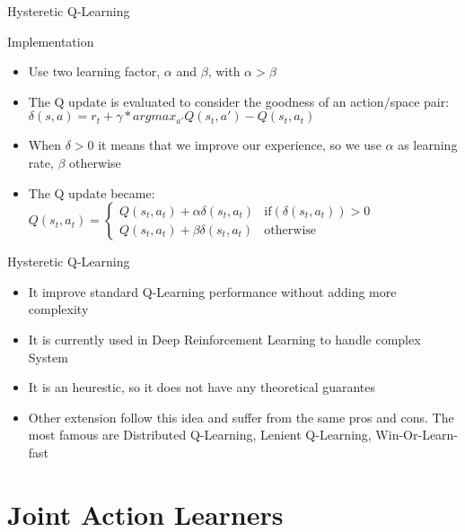 \documentclass[presentation]{beamer}\mode<presentation>{\usetheme{AMSBolognaFC}}
\begin{document}
\begin{frame}{Hysteretic Q-Learning}
	\begin{exampleblock}{Implementation}
		\begin{itemize}
			\item Use two learning factor, $\alpha$ and $\beta$, with $\alpha > \beta$
			\item The Q update is evaluated to consider the goodness of an action/space pair: $\delta(s, a) = r_t + \gamma * argmax_{a'}Q(s_t, a') - Q(s_t, a_t)$
			\item When $\delta > 0$ it means that we improve our experience, so we use $\alpha$ as learning rate, $\beta$ otherwise
			\item The Q update became: $ Q(s_t, a_t) =
			\begin{cases}
				Q(s_t, a_t) + \alpha{\delta(s_t, a_t)} & \text{if} (\delta(s_t, a_t)) > 0 \\
				Q(s_t, a_t) + \beta{\delta(s_t, a_t)} & \text{otherwise}
			\end{cases} $
		\end{itemize}
	\end{exampleblock}
\end{frame}

\begin{frame}{Hysteretic Q-Learning}
	\begin{exampleblock}{}
		\begin{itemize}
			\item[{\color{teal} \faThumbsUp}] It improve standard Q-Learning performance without adding more complexity
			\item[{\color{teal} \faThumbsUp}] It is currently used in Deep Reinforcement Learning to handle complex System
			\item[{\color{red} \faThumbsDown}] It is an heurestic, so it does not have any theoretical guarantes
			\item Other extension follow this idea and suffer from the same pros and cons. The most famous are Distributed Q-Learning, Lenient Q-Learning, Win-Or-Learn-fast
		\end{itemize}
	\end{exampleblock}
\end{frame}
\section{Joint Action Learners}
\end{document}
